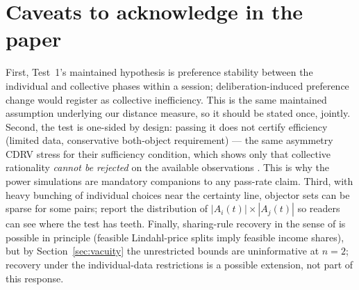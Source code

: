 \documentclass[11pt]{article}
\theoremstyle{remark}
\begin{document}
\section{Caveats to acknowledge in the paper}\label{sec:caveats}

First, Test~1's maintained hypothesis is preference stability between the individual and collective phases within a session; deliberation-induced preference change would register as collective inefficiency. This is the same maintained assumption underlying our distance measure, so it should be stated once, jointly. Second, the test is one-sided by design: passing it does not certify efficiency (limited data, conservative both-object requirement) --- the same asymmetry CDRV stress for their sufficiency condition, which shows only that collective rationality \emph{cannot be rejected} on the available observations \citep[fn.~11]{cherchye2007}. This is why the power simulations are mandatory companions to any pass-rate claim. Third, with heavy bunching of individual choices near the certainty line, objector sets can be sparse for some pairs; report the distribution of $|A_i(t)|\times|A_j(t)|$ so readers can see where the test has teeth. Finally, sharing-rule recovery in the sense of \citet[Sec.~3.3]{cherchye2011} is possible in principle (feasible Lindahl-price splits imply feasible income shares), but by Section~\ref{sec:vacuity} the unrestricted bounds are uninformative at $n=2$; recovery under the individual-data restrictions is a possible extension, not part of this response.



\end{document}

